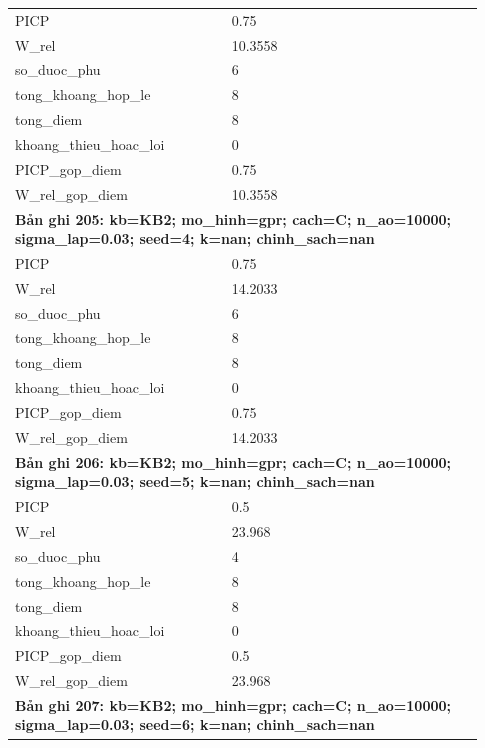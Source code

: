 \begin{longtable}{p{0.43\linewidth}p{0.50\linewidth}}
PICP & 0.75 \\
W\_\allowbreak rel & 10.3558 \\
so\_\allowbreak duoc\_\allowbreak phu & 6 \\
tong\_\allowbreak khoang\_\allowbreak hop\_\allowbreak le & 8 \\
tong\_\allowbreak diem & 8 \\
khoang\_\allowbreak thieu\_\allowbreak hoac\_\allowbreak loi & 0 \\
PICP\_\allowbreak gop\_\allowbreak diem & 0.75 \\
W\_\allowbreak rel\_\allowbreak gop\_\allowbreak diem & 10.3558 \\
\midrule
\multicolumn{2}{p{0.95\linewidth}}{\textbf{Bản ghi 205: kb=KB2; mo\_hinh=gpr; cach=C; n\_ao=10000; sigma\_lap=0.03; seed=4; k=nan; chinh\_sach=nan}} \\
PICP & 0.75 \\
W\_\allowbreak rel & 14.2033 \\
so\_\allowbreak duoc\_\allowbreak phu & 6 \\
tong\_\allowbreak khoang\_\allowbreak hop\_\allowbreak le & 8 \\
tong\_\allowbreak diem & 8 \\
khoang\_\allowbreak thieu\_\allowbreak hoac\_\allowbreak loi & 0 \\
PICP\_\allowbreak gop\_\allowbreak diem & 0.75 \\
W\_\allowbreak rel\_\allowbreak gop\_\allowbreak diem & 14.2033 \\
\midrule
\multicolumn{2}{p{0.95\linewidth}}{\textbf{Bản ghi 206: kb=KB2; mo\_hinh=gpr; cach=C; n\_ao=10000; sigma\_lap=0.03; seed=5; k=nan; chinh\_sach=nan}} \\
PICP & 0.5 \\
W\_\allowbreak rel & 23.968 \\
so\_\allowbreak duoc\_\allowbreak phu & 4 \\
tong\_\allowbreak khoang\_\allowbreak hop\_\allowbreak le & 8 \\
tong\_\allowbreak diem & 8 \\
khoang\_\allowbreak thieu\_\allowbreak hoac\_\allowbreak loi & 0 \\
PICP\_\allowbreak gop\_\allowbreak diem & 0.5 \\
W\_\allowbreak rel\_\allowbreak gop\_\allowbreak diem & 23.968 \\
\midrule
\multicolumn{2}{p{0.95\linewidth}}{\textbf{Bản ghi 207: kb=KB2; mo\_hinh=gpr; cach=C; n\_ao=10000; sigma\_lap=0.03; seed=6; k=nan; chinh\_sach=nan}} \\

\end{longtable}
